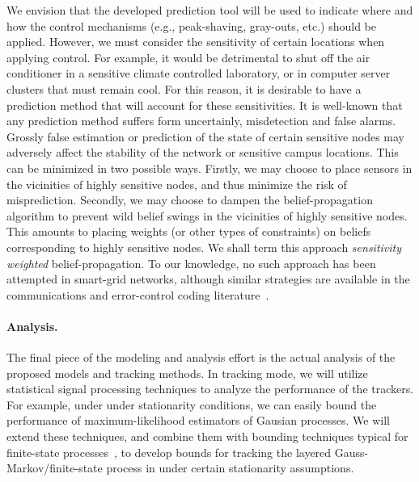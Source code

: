 We envision that the developed prediction tool will be used to indicate
where and how the control mechanisms (e.g., peak-shaving, gray-outs, etc.)
should be applied. However, we must consider the sensitivity of certain
locations when applying control.  For example, it would be detrimental to
shut off the air conditioner in a sensitive climate controlled laboratory,
or in computer server clusters that must remain cool. For this reason, it
is desirable to have a prediction method that will account for these
sensitivities.  It is well-known that any prediction method suffers form
uncertainly, misdetection and false alarms. Grossly false estimation or
prediction of the state of certain sensitive nodes may adversely affect the
stability of the network or sensitive campus locations.  This can be
minimized in two possible ways. Firstly, we may choose to place sensors in
the vicinities of highly sensitive nodes, and thus minimize the risk of
misprediction. Secondly, we may choose to dampen the belief-propagation
algorithm to prevent wild belief swings in the vicinities of highly
sensitive nodes. This amounts to placing weights (or other types of
constraints) on beliefs corresponding to highly sensitive nodes. We shall
term this approach {\em sensitivity weighted} belief-propagation. To our
knowledge, no such approach has been attempted in smart-grid networks,
although similar strategies are available in the communications and
error-control coding literature~\cite{Poor,Narayanan,Varnica}.

\paragraph{Analysis.} The final piece of the modeling and analysis effort
is the actual analysis of the proposed models and tracking methods. In
tracking mode, we will utilize statistical signal processing techniques to
analyze the performance of the trackers.  For example, under under
stationarity conditions, we can easily bound the performance of
maximum-likelihood estimators of Gausian processes. We will extend these
techniques, and combine them with bounding techniques typical for
finite-state processes~\cite{Huang09}, to develop bounds for tracking the
layered Gauss-Markov/finite-state process in under certain stationarity assumptions.

